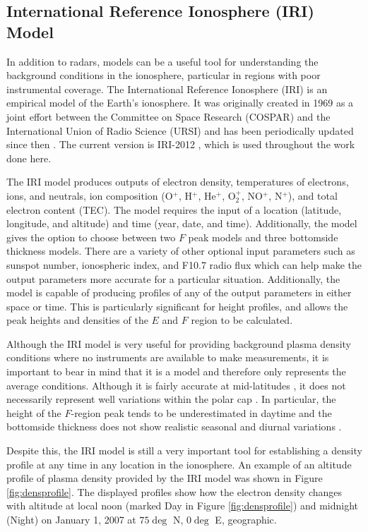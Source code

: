 \subsection{International Reference Ionosphere (IRI) Model}
\label{sec:iri}
In addition to radars, models can be a useful tool for understanding the background conditions in the ionosphere, particular in regions with poor instrumental coverage.  The International Reference Ionosphere (IRI) is an empirical model of the Earth's ionosphere.  It was originally created in 1969 as a joint effort between the Committee on Space Research (COSPAR) and the International Union of Radio Science (URSI) and has been periodically updated since then \citep{Rawer1975,Rawer1978,Rawer1981,Bilitza1985,Bilitza1986,Bilitza1990,Bilitza1997,Bilitza2001,Bilitza2008}.  The current version is IRI-2012 \citep{Bilitza2014}, which is used throughout the work done here.

The IRI model produces outputs of electron density, temperatures of electrons, ions, and neutrals, ion composition (O\(^+\), H\(^+\), He\(^+\), O\(_2^+\), NO\(^+\), N\(^+\)), and total electron content (TEC).  The model requires the input of a location (latitude, longitude, and altitude) and time (year, date, and time).  Additionally, the model gives the option to choose between two \(F\) peak models and three bottomside thickness models.  There are a variety of other optional input parameters such as sunspot number, ionospheric index, and F10.7 radio flux which can help make the output parameters more accurate for a particular situation.  Additionally, the model is capable of producing profiles of any of the output parameters in either space or time.  This is particularly significant for height profiles, and allows the peak heights and densities of the \(E\) and \(F\) region to be calculated.

Although the IRI model is very useful for providing background plasma density conditions where no instruments are available to make measurements, it is important to bear in mind that it is a model and therefore only represents the average conditions.  Although it is fairly accurate at mid-latitudes \citep{Coisson2006,Bilitza2012}, it does not necessarily represent well variations within the polar cap \citep{Themens2014,Makarevich2015b}.  In particular, the height of the \(F\)-region peak tends to be underestimated in daytime and the bottomside thickness does not show realistic seasonal and diurnal variations \citep{Themens2014}.  

Despite this, the IRI model is still a very important tool for establishing a density profile at any time in any location in the ionosphere.  An example of an altitude profile of plasma density provided by the IRI model was shown in Figure \ref{fig:densprofile}.  The displayed profiles show how the electron density changes with altitude at local noon (marked Day in Figure \ref{fig:densprofile}) and midnight (Night) on January 1, 2007 at \(75\deg\) N, \(0\deg\) E, geographic.

